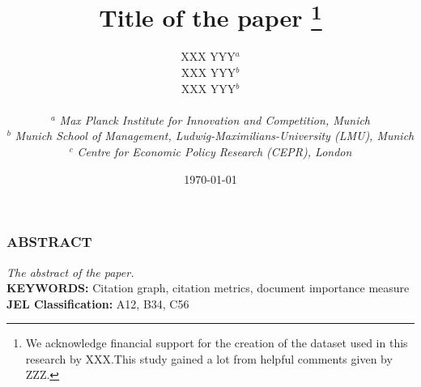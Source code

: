 



\title{\textbf{Title of the paper}
\thanks{We acknowledge financial support for the creation of the dataset used in this research by XXX.This study gained a lot from helpful comments given by ZZZ.}}


\author{
\begin{minipage}{0.3\textwidth}
    \begin{center}
    \vspace{0.1cm}
    XXX YYY$^{a}$
    \vspace{0.6cm}
    \end{center}
\end{minipage}
\begin{minipage}{0.3\textwidth}
    \begin{center}
    \vspace{0.1cm}
    XXX YYY$^{b}$
    \vspace{0.6cm}
    \end{center}
\end{minipage}
\begin{minipage}{0.3\textwidth}
    \begin{center}
    \vspace{0.1cm}
    XXX YYY$^{b}$
    \vspace{0.6cm}
    \end{center}
\end{minipage}
\\[2ex]
\renewcommand{\parskip}{-5pt}
\footnotesize $^{a}$  \emph{Max Planck Institute for Innovation and Competition, Munich}\\
\footnotesize $^{b}$  \emph{Munich School of Management, Ludwig-Maximilians-University (LMU), Munich}\\
\footnotesize $^{c}$  \emph{Centre for Economic Policy Research (CEPR), London}\\[2ex]
}

\date{\today}
\maketitle
\vspace{5mm}
\thispagestyle{empty}

\begin{center}
\subsubsection*{ABSTRACT}
\end{center}
{\small
\it
The abstract of the paper.
}
%
%
\vspace{10mm}\\
\textbf{KEYWORDS:} Citation graph, citation metrics, document importance measure
\vspace{2mm}\\
\textbf{JEL Classification:} A12, B34, C56

